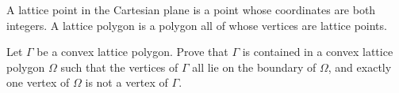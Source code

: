 A lattice point in the Cartesian plane is a point whose coordinates are both integers. A lattice polygon is a polygon all of whose vertices are lattice points.

Let $\Gamma$ be a convex lattice polygon. Prove that $\Gamma$ is contained in a convex lattice polygon $\Omega$ such that the vertices of $\Gamma$ all lie on the boundary of $\Omega$,  and exactly one vertex of $\Omega$ is not a vertex of $\Gamma$.